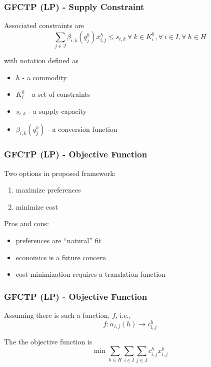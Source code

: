 \begin{frame}[ctb!]
  \frametitle{GFCTP (LP) - Supply Constraint}

  Associated constraints are
  \begin{equation}
    \sum_{j \in J}\beta_{i,k}(q_{j}^{h}) x_{i,j}^{h} \leq s_{i,k} 
    \: \forall \: k \in K_{i}^{h},  
    \forall \: i \in I, \forall \: h \in H
  \end{equation}

  with notation defined as
  \begin{itemize}
    \item $h$ - a commodity
    \item $K_i^h$ - a set of constraints
    \item $s_{i,k}$ - a supply capacity
    \item $\beta_{i,k}(q_{j}^{h})$ - a conversion function
  \end{itemize}

\end{frame}

\begin{frame}[ctb!]
  \frametitle{GFCTP (LP) - Objective Function}

  Two options in proposed framework:
  \begin{enumerate}
    \item maximize preferences
    \item minimize cost
  \end{enumerate}

  Pros and cons:
  \begin{itemize}
    \item preferences are ``natural'' fit
    \item economics is a future concern
    \item cost minimization requires a translation function
  \end{itemize}

\end{frame}

\begin{frame}[ctb!]
  \frametitle{GFCTP (LP) - Objective Function}

  Assuming there is such a function, $f$, i.e.,
  \begin{equation}
    f : \alpha_{i,j}(h) \to c_{i,j}^{h}
  \end{equation}

  The the objective function is
  \begin{equation}
    \min \sum_{h \in H}\sum_{i \in I}\sum_{j \in J}c_{i,j}^{h} x_{i,j}^{h} 
  \end{equation}

\end{frame}


